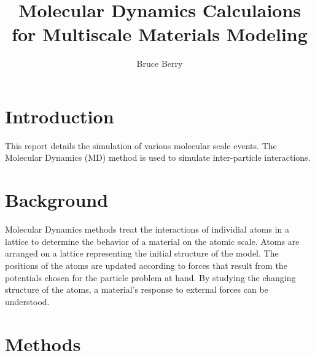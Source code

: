 \documentclass[11pt,twocolumn]{report}
\begin{document}
    \title{Molecular Dynamics Calculaions for Multiscale Materials Modeling}
    \author{Bruce Berry}
    \maketitle

    \section{Introduction}
    This report details the simulation of various molecular scale events.  The Molecular Dynamics (MD) method is used to simulate inter-particle interactions.

    \section{Background}
    Molecular Dynamics methods treat the interactions of individial atoms in a lattice to determine the behavior of a material on the atomic scale.  Atoms are arranged on a lattice representing the initial structure of the model.  The positions of the atoms are updated according to forces that result from the potentials chosen for the particle problem at hand.  By studying the changing structure of the atoms, a material's response to external forces can be understood.

    \section{Methods}
\end{document}
